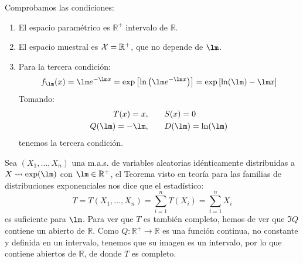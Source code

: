 \begin{ejercicio}
\begin{enumerate}[label=\alph*)]
            Comprobamos las condiciones:
            \begin{enumerate}[label=\arabic*.]
                \item El espacio paramétrico es $\mathbb{R}^+ $ intervalo de $\mathbb{R}$.
                \item El espacio muestral es $\mathcal{X} = \mathbb{R}^+$, que no depende de $\lm$.
                \item Para la tercera condición:
                    \begin{equation*}
                        f_\lm(x) = \lm e^{-\lm x} = \exp\left[\ln\left(\lm e^{-\lm x} \right)\right] = \exp\left[\ln(\lm) -\lm x\right]
                    \end{equation*}
                    Tomando:
                    \begin{align*}
                        T(x) = x, &\qquad S(x) = 0 \\
                        Q(\lm) = -\lm, &\qquad D(\lm) = \ln(\lm)
                    \end{align*}
                    tenemos la tercera condición.
            \end{enumerate}
            Sea $(X_1, \ldots, X_n)$ una m.a.s. de variables aleatorias idénticamente distribuidas a $X\rightsquigarrow \exp(\lm)$ con $\lm \in \mathbb{R}^+$, el Teorema visto en teoría para las familias de distribuciones exponenciales nos dice que el estadístico:
            \begin{equation*}
                T = T(X_1, \ldots, X_n) = \sum_{i=1}^{n}T(X_i) = \sum_{i=1}^{n}X_i
            \end{equation*}
            es suficiente para $\lm$. Para ver que $T$ es también completo, hemos de ver que $\Im Q$ contiene un abierto de $\mathbb{R}$. Como $Q:\mathbb{R}^+\to\mathbb{R}$ es una función continua, no constante y definida en un intervalo, tenemos que su imagen es un intervalo, por lo que contiene abiertos de $\mathbb{R}$, de donde $T$ es completo.
    \end{enumerate}
\end{ejercicio}

